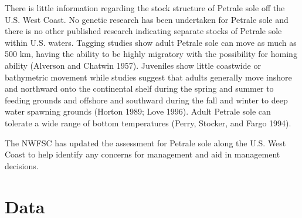 \documentclass[
]{scrartcl}
\begin{document}
There is little information regarding the stock structure of Petrale
sole off the U.S. West Coast. No genetic research has been undertaken
for Petrale sole and there is no other published research indicating
separate stocks of Petrale sole within U.S. waters. Tagging studies show
adult Petrale sole can move as much as 500 km, having the ability to be
highly migratory with the possibility for homing ability (Alverson and
Chatwin 1957). Juveniles show little coastwide or bathymetric movement
while studies suggest that adults generally move inshore and northward
onto the continental shelf during the spring and summer to feeding
grounds and offshore and southward during the fall and winter to deep
water spawning grounds (Horton 1989; Love 1996). Adult Petrale sole can
tolerate a wide range of bottom temperatures (Perry, Stocker, and Fargo
1994).

The NWFSC has updated the assessment for Petrale sole along the U.S.
West Coast to help identify any concerns for management and aid in
management decisions.

\section{Data}\label{sec-data}
\end{document}
